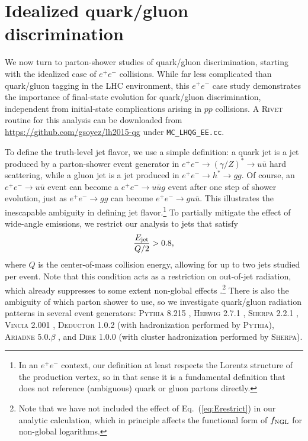 \documentclass[11pt,letterpaper]{article}
\DeclareRobustCommand{\Eq}[1]{Eq.~(\ref{#1})}
\begin{document}
\section{Idealized quark/gluon discrimination}
\label{sec:ee}

We now turn to parton-shower studies of quark/gluon discrimination, starting with the idealized case of $e^+ e^-$ collisions.  While far less complicated than quark/gluon tagging in the LHC environment, this $e^+ e^-$ case study demonstrates the importance of final-state evolution for quark/gluon discrimination, independent from initial-state complications arising in $pp$ collisions.  A \textsc{Rivet} routine \cite{Buckley:2010ar} for this analysis can be downloaded from \url{https://github.com/gsoyez/lh2015-qg} under \verb|MC_LHQG_EE.cc|.

To define the truth-level jet flavor, we use a simple definition:  a quark jet is a jet produced by a parton-shower event generator in $e^+ e^- \to (\gamma/Z)^* \to u \bar{u}$ hard scattering, while a gluon jet is a jet produced in $e^+ e^- \to h^* \to gg$.  Of course, an $e^+e^- \to u \bar u$ event can become a $e^+e^- \to u \bar u g$ event after one step of shower evolution, just as $e^+e^- \to g g$ can become $e^+e^- \to g u \bar u$.  This illustrates the inescapable ambiguity in defining jet flavor.\footnote{In an $e^+e^-$ context, our definition at least respects the Lorentz structure of the production vertex, so in that sense it is a fundamental definition that does not reference (ambiguous) quark or gluon partons directly.}  To partially mitigate the effect of wide-angle emissions, we restrict our analysis to jets that satisfy
\begin{equation}
\label{eq:Erestrict}
\frac{E_{\rm jet}}{Q/2} > 0.8,
\end{equation}
where $Q$ is the center-of-mass collision energy, allowing for up to
two jets studied per event.  Note that this condition acts as a
restriction on out-of-jet radiation, which already suppresses to some
extent non-global effects \cite{Dasgupta:2001sh}.\footnote{Note that
  we have not included the effect of \Eq{eq:Erestrict} in our analytic calculation,
  which in principle affects the functional form of $f_{\rm NGL}$ for non-global logarithms.}
%
There is also the ambiguity of which parton shower to use, so we
investigate quark/gluon radiation patterns in several event
generators: \textsc{Pythia 8.215} \cite{Sjostrand:2014zea},
\textsc{Herwig 2.7.1} \cite{Bahr:2008pv,Bellm:2013hwb}, \textsc{Sherpa
  2.2.1} \cite{Gleisberg:2008ta}, \textsc{Vincia 2.001}
\cite{Fischer:2016vfv}, \textsc{Deductor 1.0.2} \cite{Nagy:2014mqa}
(with hadronization performed by \textsc{Pythia}), \textsc{Ariadne
  5.0.$\beta$} \cite{Flensburg:2011kk}, and \textsc{Dire 1.0.0}
\cite{Hoche:2015sya} (with cluster hadronization performed by
\textsc{Sherpa}).
\end{document}

